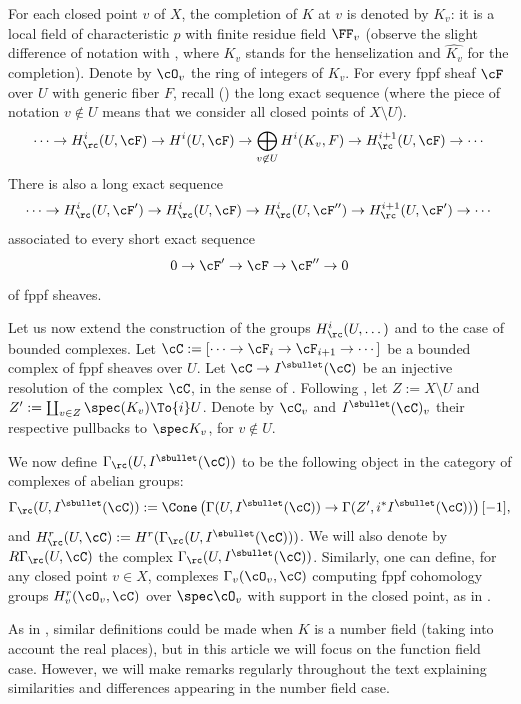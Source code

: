 For each closed point $v$ of $X$, the completion of $K$ at $v$
is denoted by $K_v$: it is a local field of characteristic $p$ with
finite residue field $\FF_v$ (observe the slight difference of notation with
\cite{DemH}, where $K_v$ stands for the henselization and $\widehat{K_v}$
for the completion). Denote by $\cO_v$ the ring of integers of $K_v$.
For every fppf sheaf $\cF$
over $U$ with generic fiber $F$, recall (\cite[Prop.\,2.1]{DemH})
the long exact sequence (where the piece of notation $v \not \in U$ means
that we consider all closed points of $X\setminus U$).
\begin{equation} \label{suppcomp}
\cdots\to H^i_\rc(U,\cF) \to H^i(U,\cF) \to \bigoplus_{v \not
\in U} H^i(K_v,F) \to H^{i+1}_\rc(U,\cF) \to\cdots
\end{equation}
There is also a long exact sequence
\begin{equation} \label{longex1}
\cdots\to H^i_\rc(U,\cF') \to H^i_\rc(U,\cF) \to
H^i_\rc(U,\cF'') \to H^{i+1}_\rc(U,\cF ') \to\cdots
\end{equation}
associated to every short exact sequence
\[
0 \to \cF' \to \cF \to \cF'' \to 0
\]
of fppf sheaves.

Let us now extend the construction of the groups $H^i_\rc(U,\dots)$ and \cite[Prop.\,2.1]{DemH} to the case of bounded complexes.
Let $\cC:= [\cdots\to \cF_i \to \cF_{i+1} \to\cdots]$ be a bounded complex of fppf sheaves over $U$.
Let $\cC \to I^\sbullet(\cC)$ be an injective resolution of the complex $\cC$, in the sense of \cite[Tag 013K]{SP}.
Following \cite[\S2]{DemH}, let $Z:= X \setminus U$ and
$Z':= \coprod_{v \in Z} \spec({K_v}) \To{i} U$.
Denote by $\cC_v$ and $I^\sbullet(\cC)_v$ their respective
pullbacks to $\spec K_v$, for $v \notin U$.

We now define $\Gamma_\rc(U, I^\sbullet(\cC))$ to be the following object in the category of complexes of abelian groups:
\[
\Gamma_\rc(U, I^\sbullet(\cC)):= \Cone\left(\Gamma(U, I^\sbullet(\cC)) \to \Gamma(Z', i^* I^\sbullet(\cC)) \right)[-1],
\]
and $H^r_\rc(U, \cC):= H^r(\Gamma_\rc(U, I^\sbullet(\cC)))$. We will also denote by $R\Gamma_\rc(U,\cC)$ the complex $\Gamma_\rc(U, I^\sbullet(\cC))$.
Similarly, one can define, for any closed point $v \in X$, complexes $\Gamma_v(\cO_v, \cC)$ computing fppf cohomology groups $H^r_v(\cO_v, \cC)$ over $\spec \cO_v$ with support in the closed point, as in \cite[before Lem.\,2.6]{DemH}.

As in \cite{DemH}, similar definitions could be made when $K$ is a number field (taking into account the real places), but in this article we will focus on the function field case. However, we will make remarks regularly throughout the text explaining similarities and differences appearing in the number field case.

